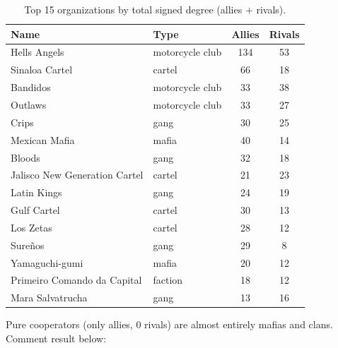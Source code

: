 \documentclass[11pt,a4paper]{article}
\begin{document}
\begin{table}[H]
\centering
\caption{Top 15 organizations by total signed degree (allies $+$ rivals).}
\label{tab:signed}
\small
\begin{tabular}{@{}llcc@{}}
\toprule
\textbf{Name} & \textbf{Type} & \textbf{Allies} & \textbf{Rivals} \\
\midrule
Hells Angels & motorcycle club & 134 & 53 \\
Sinaloa Cartel & cartel & 66 & 18 \\
Bandidos & motorcycle club & 33 & 38 \\
Outlaws & motorcycle club & 33 & 27 \\
Crips & gang & 30 & 25 \\
Mexican Mafia & mafia & 40 & 14 \\
Bloods & gang & 32 & 18 \\
Jalisco New Generation Cartel & cartel & 21 & 23 \\
Latin Kings & gang & 24 & 19 \\
Gulf Cartel & cartel & 30 & 13 \\
Los Zetas & cartel & 28 & 12 \\
Sureños & gang & 29 & 8 \\
Yamaguchi-gumi & mafia & 20 & 12 \\
Primeiro Comando da Capital & faction & 18 & 12 \\
Mara Salvatrucha & gang & 13 & 16 \\
\bottomrule
\end{tabular}
\end{table}

Pure cooperators (only allies, 0 rivals) are almost entirely mafias and clans. Comment result below:

\end{document}
